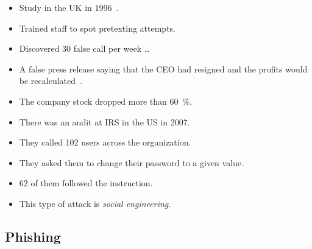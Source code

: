 \begin{frame}
  \begin{example}
    \begin{itemize}
      \item Study in the UK in 1996~\cite{Anderson2008sea}.
      \item Trained staff to spot pretexting attempts.
      \item Discovered 30 false call per week \dots
    \end{itemize}
  \end{example}
\end{frame}

\begin{frame}
  \begin{example}
    \begin{itemize}
      \item A false press release saying that the CEO had resigned and the 
        profits would be recalculated~\cite{Anderson2008sea}.
      \item The company stock dropped more than \SI{60}{\%}.
    \end{itemize}
  \end{example}
\end{frame}

\begin{frame}
  \begin{example}
    \begin{itemize}
      \item There was an audit at IRS in the US in 2007.
      \item They called 102 users across the organization.
      \item They asked them to change their password to a given value.
      \item 62 of them followed the instruction.
    \end{itemize}
  \end{example}
\end{frame}

\begin{frame}
  \begin{remark}
    \begin{itemize}
      \item This type of attack is \emph{social engineering}.
    \end{itemize}
  \end{remark}
\end{frame}

\subsection{Phishing}

